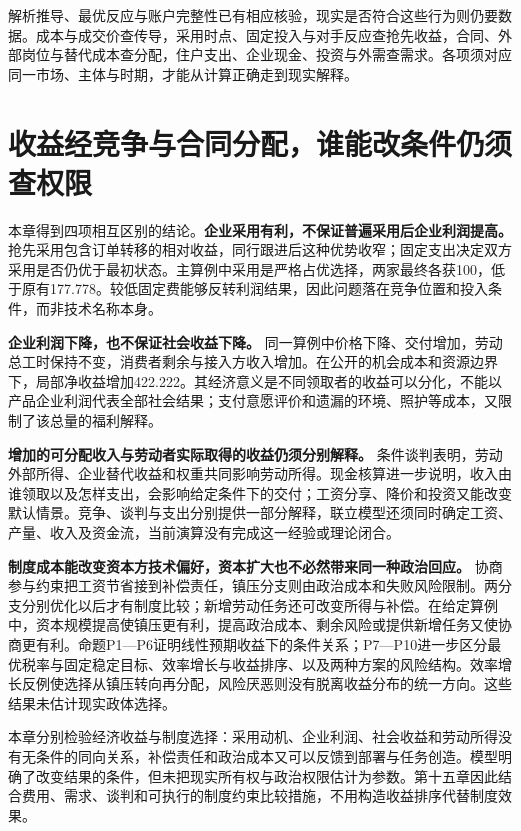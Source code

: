 \documentclass[UTF8,fontset=windows,12pt,a4paper,oneside,openany]{ctexbook}
\begin{document}
解析推导、最优反应与账户完整性已有相应核验，现实是否符合这些行为则仍要数据。成本与成交价查传导，采用时点、固定投入与对手反应查抢先收益，合同、外部岗位与替代成本查分配，住户支出、企业现金、投资与外需查需求。各项须对应同一市场、主体与时期，才能从计算正确走到现实解释。

\section{收益经竞争与合同分配，谁能改条件仍须查权限}

本章得到四项相互区别的结论。\textbf{企业采用有利，不保证普遍采用后企业利润提高。} 抢先采用包含订单转移的相对收益，同行跟进后这种优势收窄；固定支出决定双方采用是否仍优于最初状态。主算例中采用是严格占优选择，两家最终各获100，低于原有177.778。较低固定费能够反转利润结果，因此问题落在竞争位置和投入条件，而非技术名称本身。

\textbf{企业利润下降，也不保证社会收益下降。} 同一算例中价格下降、交付增加，劳动总工时保持不变，消费者剩余与接入方收入增加。在公开的机会成本和资源边界下，局部净收益增加422.222。其经济意义是不同领取者的收益可以分化，不能以产品企业利润代表全部社会结果；支付意愿评价和遗漏的环境、照护等成本，又限制了该总量的福利解释。

\textbf{增加的可分配收入与劳动者实际取得的收益仍须分别解释。} 条件谈判表明，劳动外部所得、企业替代收益和权重共同影响劳动所得。现金核算进一步说明，收入由谁领取以及怎样支出，会影响给定条件下的交付；工资分享、降价和投资又能改变默认情景。竞争、谈判与支出分别提供一部分解释，联立模型还须同时确定工资、产量、收入及资金流，当前演算没有完成这一经验或理论闭合。



\textbf{制度成本能改变资本方技术偏好，资本扩大也不必然带来同一种政治回应。} 协商参与约束把工资节省接到补偿责任，镇压分支则由政治成本和失败风险限制。两分支分别优化以后才有制度比较；新增劳动任务还可改变所得与补偿。在给定算例中，资本规模提高使镇压更有利，提高政治成本、剩余风险或提供新增任务又使协商更有利。命题P1—P6证明线性预期收益下的条件关系；P7—P10进一步区分最优税率与固定稳定目标、效率增长与收益排序、以及两种方案的风险结构。效率增长反例使选择从镇压转向再分配，风险厌恶则没有脱离收益分布的统一方向。这些结果未估计现实政体选择。

本章分别检验经济收益与制度选择：采用动机、企业利润、社会收益和劳动所得没有无条件的同向关系，补偿责任和政治成本又可以反馈到部署与任务创造。模型明确了改变结果的条件，但未把现实所有权与政治权限估计为参数。第十五章因此结合费用、需求、谈判和可执行的制度约束比较措施，不用构造收益排序代替制度效果。
\end{document}
